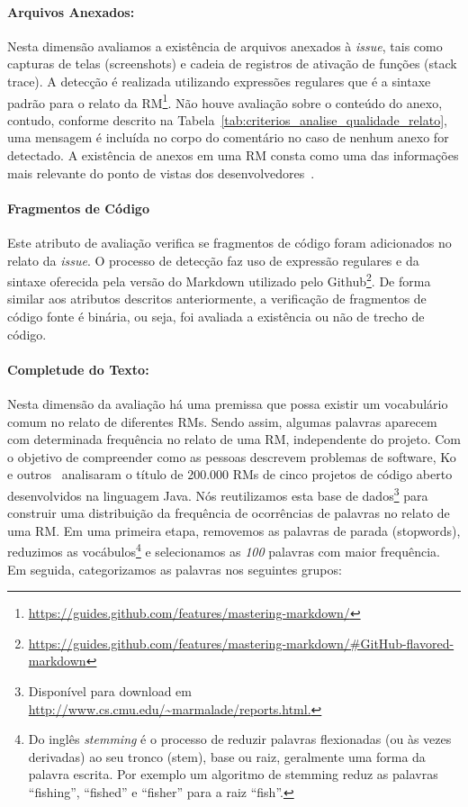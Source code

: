 \paragraph{Arquivos Anexados:}
\label{par:arquivos_anexados}

Nesta dimensão avaliamos a existência de arquivos anexados à \textit{issue},
tais como capturas de telas (screenshots) e cadeia de registros de ativação de
funções (stack trace). A detecção é realizada utilizando expressões regulares
que é a sintaxe padrão para o relato da
RM\footnote{\url{https://guides.github.com/features/mastering-markdown/}}. Não
houve avaliação sobre o conteúdo do anexo, contudo, conforme descrito na
Tabela~\ref{tab:criterios_analise_qualidade_relato}, uma mensagem é incluída no
corpo do comentário no caso de nenhum anexo for detectado. A existência de
anexos em uma RM consta como uma das informações mais relevante do ponto de
vistas dos desenvolvedores~\cite{bettenburg2008makes}.

\paragraph{Fragmentos de Código}
\label{par:fragmentos_de_código}

Este atributo de avaliação verifica se fragmentos de código foram adicionados no
relato da \textit{issue}. O processo de detecção faz uso de expressão regulares
e da sintaxe oferecida pela versão do Markdown utilizado pelo
Github\footnote{\url{https://guides.github.com/features/mastering-markdown/\#GitHub-flavored-markdown}}.
De forma similar aos atributos descritos anteriormente, a verificação de
fragmentos de código fonte é binária, ou seja, foi avaliada a existência ou não
de trecho de código.

\paragraph{Completude do Texto:}
\label{par:completude_de_palavras_chaves}

Nesta dimensão da avaliação há uma premissa que possa existir um vocabulário
comum no relato de diferentes RMs. Sendo assim, algumas palavras aparecem com
determinada frequência no relato de uma RM, independente do projeto. Com o
objetivo de compreender como as pessoas descrevem problemas de software, Ko e
outros~\cite{ko2006linguistic} analisaram o título de 200.000 RMs de cinco
projetos de código aberto desenvolvidos na linguagem Java. Nós reutilizamos esta
base de dados\footnote{Disponível para download em
    \url{http://www.cs.cmu.edu/~marmalade/reports.html.}} para construir uma
distribuição da frequência de ocorrências de palavras no relato de uma RM\@.  Em
uma primeira etapa, removemos as palavras de parada (stopwords), reduzimos as
vocábulos\footnote{Do inglês \textit{stemming} é o processo de reduzir palavras
    flexionadas (ou às vezes derivadas) ao seu tronco (stem), base ou raiz,
    geralmente uma forma da palavra escrita. Por exemplo um algoritmo de
    stemming reduz as palavras ``fishing'', ``fished'' e ``fisher'' para a raiz
    ``fish''.} e selecionamos as \textit{100} palavras com maior frequência. Em
seguida, categorizamos as palavras nos seguintes grupos:

